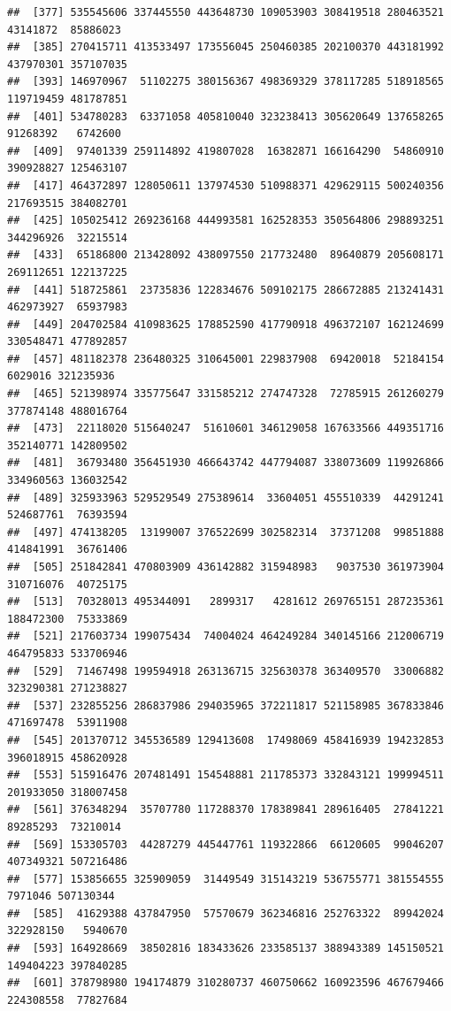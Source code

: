 \documentclass{article}\usepackage[]{graphicx}\usepackage[]{color}
\makeatletter
\newenvironment{kframe}{%
 \def\at@end@of@kframe{}%
 \ifinner\ifhmode%
  \def\at@end@of@kframe{\end{minipage}}%
  \begin{minipage}{\columnwidth}%
 \fi\fi%
 \def\FrameCommand##1{\hskip\@totalleftmargin \hskip-\fboxsep
 \colorbox{shadecolor}{##1}\hskip-\fboxsep
     \hskip-\linewidth \hskip-\@totalleftmargin \hskip\columnwidth}%
 \MakeFramed {\advance\hsize-\width
   \@totalleftmargin\z@ \linewidth\hsize
   \@setminipage}}%
 {\par\unskip\endMakeFramed%
 \at@end@of@kframe}
\newenvironment{knitrout}{}{} %
\makeatother
\begin{document}
\begin{knitrout}
\begin{kframe}
\begin{verbatim}
##  [377] 535545606 337445550 443648730 109053903 308419518 280463521  43141872  85886023
##  [385] 270415711 413533497 173556045 250460385 202100370 443181992 437970301 357107035
##  [393] 146970967  51102275 380156367 498369329 378117285 518918565 119719459 481787851
##  [401] 534780283  63371058 405810040 323238413 305620649 137658265  91268392   6742600
##  [409]  97401339 259114892 419807028  16382871 166164290  54860910 390928827 125463107
##  [417] 464372897 128050611 137974530 510988371 429629115 500240356 217693515 384082701
##  [425] 105025412 269236168 444993581 162528353 350564806 298893251 344296926  32215514
##  [433]  65186800 213428092 438097550 217732480  89640879 205608171 269112651 122137225
##  [441] 518725861  23735836 122834676 509102175 286672885 213241431 462973927  65937983
##  [449] 204702584 410983625 178852590 417790918 496372107 162124699 330548471 477892857
##  [457] 481182378 236480325 310645001 229837908  69420018  52184154   6029016 321235936
##  [465] 521398974 335775647 331585212 274747328  72785915 261260279 377874148 488016764
##  [473]  22118020 515640247  51610601 346129058 167633566 449351716 352140771 142809502
##  [481]  36793480 356451930 466643742 447794087 338073609 119926866 334960563 136032542
##  [489] 325933963 529529549 275389614  33604051 455510339  44291241 524687761  76393594
##  [497] 474138205  13199007 376522699 302582314  37371208  99851888 414841991  36761406
##  [505] 251842841 470803909 436142882 315948983   9037530 361973904 310716076  40725175
##  [513]  70328013 495344091   2899317   4281612 269765151 287235361 188472300  75333869
##  [521] 217603734 199075434  74004024 464249284 340145166 212006719 464795833 533706946
##  [529]  71467498 199594918 263136715 325630378 363409570  33006882 323290381 271238827
##  [537] 232855256 286837986 294035965 372211817 521158985 367833846 471697478  53911908
##  [545] 201370712 345536589 129413608  17498069 458416939 194232853 396018915 458620928
##  [553] 515916476 207481491 154548881 211785373 332843121 199994511 201933050 318007458
##  [561] 376348294  35707780 117288370 178389841 289616405  27841221  89285293  73210014
##  [569] 153305703  44287279 445447761 119322866  66120605  99046207 407349321 507216486
##  [577] 153856655 325909059  31449549 315143219 536755771 381554555   7971046 507130344
##  [585]  41629388 437847950  57570679 362346816 252763322  89942024 322928150   5940670
##  [593] 164928669  38502816 183433626 233585137 388943389 145150521 149404223 397840285
##  [601] 378798980 194174879 310280737 460750662 160923596 467679466 224308558  77827684

\end{verbatim}
\end{kframe}
\end{knitrout}
\end{document}
